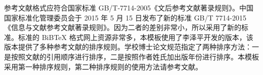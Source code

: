 

参考文献格式应符合国家标准 GB/T-7714-2005《文后参考文献著录规则》。中国国家标准化管理委员会于 2015 年 5 月 15 日发布了新的标准 GB/T 7714-2015《信息与文献参考文献著录规则》。因为二者的差别非常小，所以采用了新的标准。标准的 BiBTeX 格式网上资源非常多，本模板使用了李泽平开发的版本，该版本提供了多种参考文献的排序规则。学校博士论文规范指定了两种排序方法：一是按照文献的引用顺序进行排序，二是按照作者姓氏加出版年份进行排序。本模板采用第一种排序规则，第二种排序规则的使用方法请参考文献。


